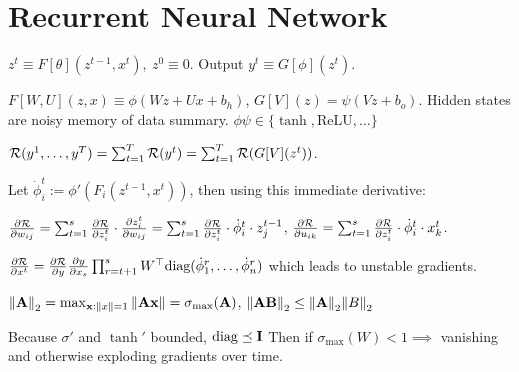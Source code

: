 \section{Recurrent Neural Network}

\begin{definition}
    \(z^t \equiv F[\theta](z^{t-1}, x^t), \ z^0 \equiv 0\). Output \(y^t \equiv G[\phi](z^t)\).
\end{definition}

\begin{definition}[Evolution Op]
    \(F[W, U](z, x) \equiv \phi(Wz + Ux + b_h)\), \(G[V](z) = \psi(Vz + b_o)\). Hidden states are noisy memory of data summary. \(\phi\psi \in \{\tanh, \text{ReLU}, \ldots\}\)
\end{definition}

\begin{definition}
    \(\mathcal{R}(y^1, \ldots, y^T) = \sum_{t=1}^T \mathcal{R}(y^t) = \sum_{t=1}^T \mathcal{R}(G[V](z^t))\).
\end{definition}

\begin{definition}[BPTT]
    Let \(\dot{\phi}_i^t := \phi'(F_i(z^{t-1}, x^t))\), then using this immediate derivative:
    
    \(\frac{\partial \mathcal{R}}{\partial w_{ij}} = \sum_{t=1}^s \frac{\partial \mathcal{R}}{\partial z_i^t} \cdot \frac{\partial z_i^t}{\partial w_{ij}} = \sum_{t=1}^s \frac{\partial\mathcal{R}}{\partial z_i^t} \cdot \dot{\phi}_i^t \cdot z_j^{t-1}\), \(\frac{\partial \mathcal{R}}{\partial u_{ik}} = \sum_{t=1}^s \frac{\partial\mathcal{R}}{\partial z_i^t} \cdot \dot{\phi}_i^t \cdot x_k^{t}\).

    \(\frac{\partial \mathcal{R}}{\partial x^t} = \frac{\partial \mathcal{R}}{\partial y} \frac{\partial y}{\partial x_s} \prod_{r=t+1}^s W^\top \text{diag}(\dot{\phi}_1^r, \ldots, \dot{\phi}_n^r)\) which leads to unstable gradients. 
\end{definition}

\begin{definition}
    \(\norm{\vb{A}}_2 = \max_{\vb{x}: \norm{x} = 1} \norm{\vb{A}\vb{x}} = \sigma_{\max}(\vb{A})\), \(\norm{\vb{A}\vb{B}}_2 \leq \norm{\vb{A}}_2 \norm{B}_2\)
\end{definition}

\begin{definition}
    Because \(\sigma'\) and \(\tanh'\) bounded, \(\text{diag} \preceq \vb{I}\) Then if \(\sigma_{\max}(W) < 1 \implies\) vanishing and otherwise exploding gradients over time.
\end{definition}

